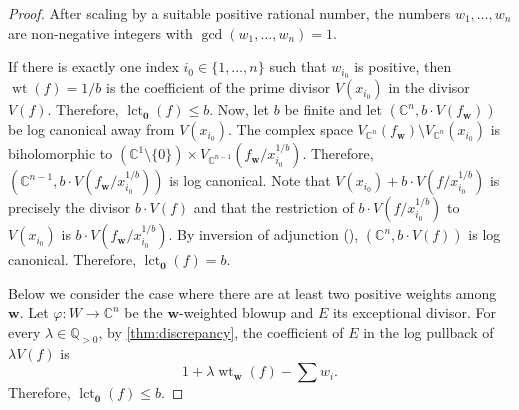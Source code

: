 \documentclass[a4paper, 12pt, oneside]{article}
\theoremstyle{plain}
\theoremstyle{definition}
\theoremstyle{remark}
\numberwithin{theorem}{section}
\numberwithin{table}{section}
\numberwithin{equation}{theorem}
\begin{document}
\begin{proof}
After scaling by a suitable positive rational number, the numbers $w_1, \ldots, w_n$ are non-negative integers with $\gcd(w_1, \ldots, w_n) = 1$.

If there is exactly one index $i_0 \in \{1, \ldots, n\}$ such that $w_{i_0}$ is positive, then $\operatorname{wt}(f) = 1/b$ is the coefficient of the prime divisor $V(x_{i_0})$ in the divisor~$V(f)$. Therefore, $\operatorname{lct}_{\bm 0}(f) \leq b$. Now, let $b$ be finite and let $(\mathbb C^n, b \cdot V(f_{\bm w}))$ be log canonical away from $V(x_{i_0})$. The complex space $V_{\mathbb C^n}(f_{\bm w}) \setminus V_{\mathbb C^n}(x_{i_0})$ is biholomorphic to $(\mathbb C^1 \setminus \{0\}) \times V_{\mathbb C^{n-1}}(f_{\bm w} / x_{i_0}^{1/b})$. Therefore, $(\mathbb C^{n-1}, b \cdot V(f_{\bm w} / x_{i_0}^{1/b}))$ is log canonical. Note that $V(x_{i_0}) + b \cdot V(f / x_{i_0}^{1/b})$ is precisely the divisor $b \cdot V(f)$ and that the restriction of $b \cdot V(f / x_{i_0}^{1/b})$ to $V(x_{i_0})$ is $b \cdot V(f_{\bm w} / x_{i_0}^{1/b})$. By inversion of adjunction (\cite[Theorem~7.5]{Kol97}), $(\mathbb C^n, b \cdot V(f))$ is log canonical. Therefore, $\operatorname{lct}_{\bm 0}(f) = b$.

Below we consider the case where there are at least two positive weights among~$\bm w$. Let $\varphi\colon W \to \mathbb C^n$ be the $\bm w$-weighted blowup and $E$ its exceptional divisor. For every $\lambda \in \mathbb Q_{>0}$, by \cref{thm:discrepancy}, the coefficient of $E$ in the log pullback of $\lambda V(f)$ is
\[
1 + \lambda \operatorname{wt}_{\bm w}(f) - \sum w_i.
\]
Therefore, $\operatorname{lct}_{\bm 0}(f) \leq b$.


\end{proof}
\end{document}
